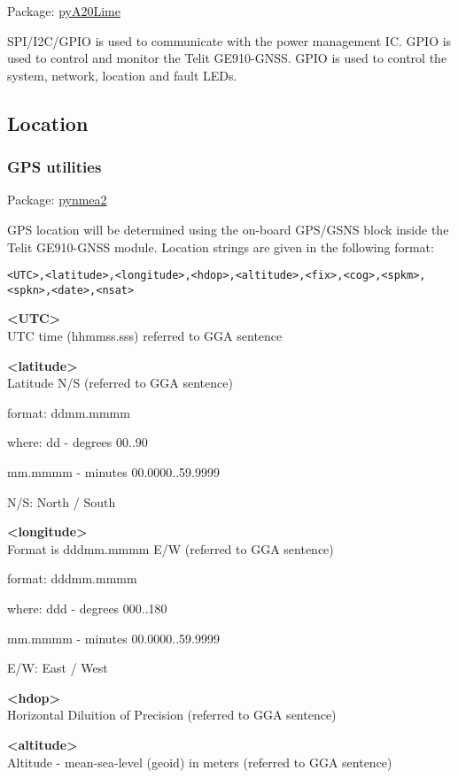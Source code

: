 Package:	\href{https://pypi.python.org/pypi/pyA20Lime}{pyA20Lime}

SPI/I2C/GPIO is used to communicate with the power management IC. GPIO is used to control and monitor the Telit GE910-GNSS. GPIO is used to control the system, network, location and fault LEDs.

\subsection{Location}

\subsubsection{GPS utilities}

Package:	\href{https://github.com/Knio/pynmea2}{pynmea2}

GPS location will be determined using the on-board GPS/GSNS block inside the Telit GE910-GNSS module. Location strings are given in the following format:
\begin{lstlisting}
<UTC>,<latitude>,<longitude>,<hdop>,<altitude>,<fix>,<cog>,<spkm>,<spkn>,<date>,<nsat>
\end{lstlisting}

\textbf{<UTC>} \\
UTC time (hhmmss.sss) referred to GGA sentence

\textbf{<latitude>} \\
Latitude N/S (referred to GGA sentence)
	
format:
ddmm.mmmm
					
where:
dd - degrees
00..90

mm.mmmm - minutes
00.0000..59.9999

N/S: North / South 

\textbf{<longitude>} \\
Format is dddmm.mmmm E/W (referred to GGA sentence) 

format:
dddmm.mmmm

where:
ddd - degrees						
000..180

mm.mmmm - minutes				
00.0000..59.9999

E/W: East / West

\textbf{<hdop>} \\
Horizontal Diluition of Precision (referred to GGA sentence) 

\textbf{<altitude>} \\
Altitude - mean-sea-level (geoid) in meters (referred to GGA sentence)

